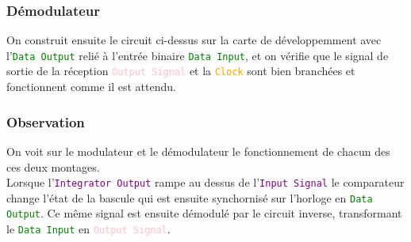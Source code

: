 \documentclass[11pt, openright]{book}
\begin{document}
\subsubsection{Démodulateur}

\begin{figure}[ht]
    \begin{floatrow}


    \end{floatrow}
\end{figure}

On construit ensuite le circuit ci-dessus sur la carte de développemment avec l'\textcolor{green}{\texttt{Data Output}} relié à l'entrée binaire \textcolor{green}{\texttt{Data Input}}, et on vérifie que le signal de sortie de la réception \textcolor{pink}{\texttt{Output Signal}} et la \textcolor{orange}{\texttt{Clock}} sont bien branchées et fonctionnent comme il est attendu.

\subsubsection{Observation}

On voit sur le modulateur et le démodulateur le fonctionnement de chacun des ces deux montages.\\
Lorsque l'\textcolor{purple}{\texttt{Integrator Output}} rampe au dessus de l'\textcolor{purple}{\texttt{Input Signal}} le comparateur change l'état de la bascule qui est ensuite synchornisé sur l'horloge en \textcolor{green}{\texttt{Data Output}}. Ce même signal est ensuite démodulé par le circuit inverse, transformant le \textcolor{green}{\texttt{Data Input}} en \textcolor{pink}{\texttt{Output Signal}}.
\end{document}
